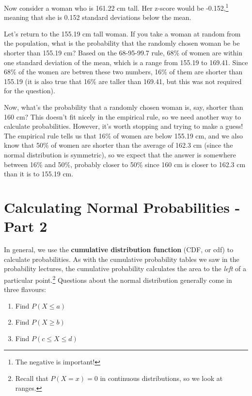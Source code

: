 \documentclass[
  letterpaper,
  DIV=11,
  numbers=noendperiod]{scrreprt}
\providecommand{\tightlist}{%
  \setlength{\itemsep}{0pt}\setlength{\parskip}{0pt}}\usepackage{longtable,booktabs,array}
\begin{document}
Now consider a woman who is 161.22 cm tall. Her z-score would be
-0.152,\footnote{The negative is important!} meaning that she is 0.152
standard deviations below the mean.

Let's return to the 155.19 cm tall woman. If you take a woman at random
from the population, what is the probability that the randomly chosen
woman be be shorter than 155.19 cm? Based on the 68-95-99.7 rule, 68\%
of women are within one standard deviation of the mean, which is a range
from 155.19 to 169.41. Since 68\% of the women are betwen these two
numbers, 16\% of them are shorter than 155.19 (it is also true that 16\%
are taller than 169.41, but this was not required for the question).

Now, what's the probability that a randomly chosen woman is, say,
shorter than 160 cm? This doesn't fit nicely in the empirical rule, so
we need another way to calculate probabilities. However, it's worth
stopping and trying to make a guess! The empirical rule tells us that
16\% of women are below 155.19 cm, and we also know that 50\% of women
are shorter than the average of 162.3 cm (since the normal distribution
is symmetric), so we expect that the answer is somewhere between 16\%
and 50\%, probably closer to 50\% since 160 cm is closer to 162.3 cm
than it is to 155.19 cm.

\hypertarget{calculating-normal-probabilities---part-2}{%
\chapter{Calculating Normal Probabilities - Part
2}\label{calculating-normal-probabilities---part-2}}

In general, we use the \textbf{cumulative distribution function} (CDF,
or cdf) to calculate probabilities. As with the cumulative probability
tables we saw in the probability lectures, the cumulative probability
calculates the area to the \emph{left} of a particular point.\footnote{Recall
  that \(P(X=x) = 0\) in continuous distributions, so we look at ranges.}
Questions about the normal distribution generally come in three
flavours:

\begin{enumerate}
\def\labelenumi{\arabic{enumi}.}
\tightlist
\item
  Find \(P(X \le a)\)
\item
  Find \(P(X \ge b)\)
\item
  Find \(P(c \le X\le d)\)
\end{enumerate}
\end{document}
